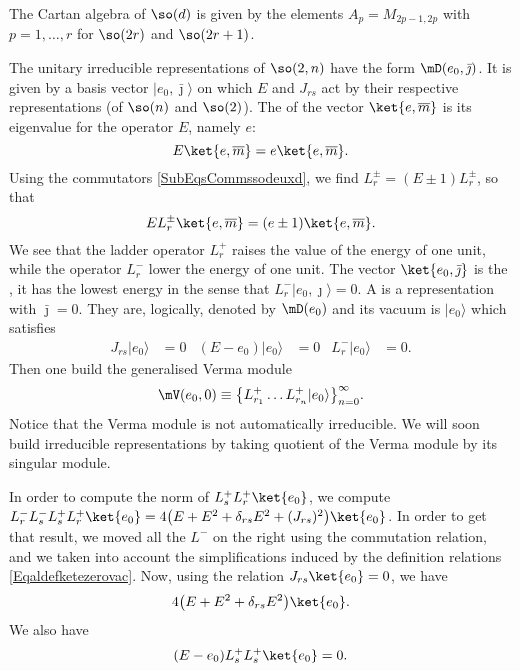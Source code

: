 The Cartan algebra of $\so(d)$ is given by the elements $A_p=M_{2p-1,2p}$ with $p=1,\ldots, r$ for $\so(2r)$ and $\so(2r+1)$.

The unitary irreducible representations of $\so(2,n)$ have the form $\mD(e_0,\bar\jmath)$. It is given by a basis vector $| e_0,\bar\jmath \rangle$ on which $E$ and $J_{rs}$ act by their respective representations (of $\so(n)$ and $\so(2)$). The  of the vector $\ket{e,\overline{ m }}$ is its eigenvalue for the operator $E$, namely $e$:
\begin{equation}
	E\ket{e,\overline{ m }}=e\ket{e,\overline{ m }}.
\end{equation}
Using the commutators \eqref{SubEqsCommssodeuxd}, we find $L_r^{\pm}=(E\pm 1)L_r^{\pm}$, so that
\begin{equation}
	E L^{\pm}_r\ket{e,\overline{ m }} =(e\pm 1)\ket{e,\overline{ m }}.
\end{equation}
We see that the ladder operator $L_r^+$ raises the value of the energy of one unit, while the operator $L_r^-$ lower the energy of one unit. The vector $\ket{e_0,\bar\jmath}$ is the , it has the lowest energy in the sense that $L^{-}_r| e_0,\jmath \rangle=0$. A  is a representation with $\bar\jmath=0$. They are, logically, denoted by $\mD(e_0)$ and its vacuum is $| e_0 \rangle$ which satisfies
\begin{align}		\label{Eqaldefketezerovac}
	J_{rs}| e_0 \rangle & = 0	& (E-e_0)| e_0 \rangle&=0	&L_r^{-}| e_0 \rangle&=0.
\end{align}
Then one build the generalised Verma module
\begin{equation}	\label{EqmVVermaldots}
	\mV(e_0,0)\equiv \big\{   L_{r_1}^+\ldots L_{r_n}^+| e_0 \rangle   \big\}_{n=0}^{\infty}.
\end{equation}
Notice that the Verma module is not automatically irreducible. We will soon build irreducible representations by taking quotient of the Verma module by its singular module.

In order to compute the norm of $L_s^+L_r^+\ket{e_0}$, we compute $L^-_rL^-_sL^+_sL^+_r\ket{e_0} =4\big(E+E^2+\delta_{rs}E^2+(J_{rs})^2\big)\ket{e_0}$. In order to get that result, we moved all the $L^-$ on the right using the commutation relation, and we taken into account the simplifications induced by the definition relations \eqref{Eqaldefketezerovac}. Now, using the relation $J_{rs}\ket{e_0}=0$, we have
\begin{equation}
	4\big(E+E^2+\delta_{rs}E^2\big)\ket{e_0}.
\end{equation} We also have
\begin{equation}
	(E-e_0)L^+_sL^+_s\ket{e_0}=0.
\end{equation}

